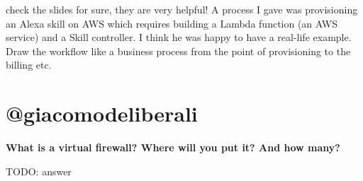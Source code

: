 check the slides for sure, they are very helpful! A process I gave was
provisioning an Alexa skill on AWS which requires building a Lambda
function (an AWS service) and a Skill controller. I think he was happy
to have a real-life example. Draw the workflow like a business process
from the point of provisioning to the billing etc.

\hypertarget{giacomodeliberali}{%
\section{@giacomodeliberali}\label{giacomodeliberali}}

\textbf{What is a virtual firewall? Where will you put it? And how
many?}

TODO: answer


